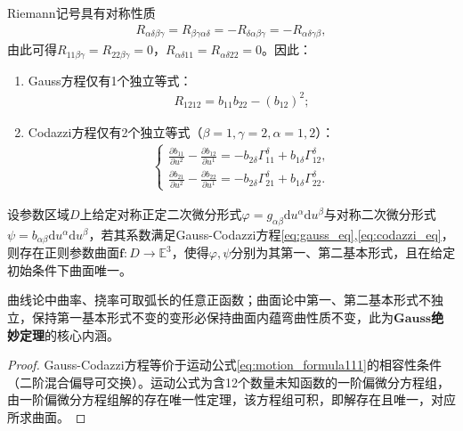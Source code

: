 \documentclass[../../main.tex]{subfiles}%
\begin{document}
\begin{remark}
Riemann记号具有对称性质
\begin{align*}
R_{\alpha\delta\beta\gamma} = R_{\beta\gamma\alpha\delta} = -R_{\delta\alpha\beta\gamma} = -R_{\alpha\delta\gamma\beta},
\end{align*}
由此可得$R_{11\beta\gamma}=R_{22\beta\gamma}=0$，$R_{\alpha\delta11}=R_{\alpha\delta22}=0$。因此：
\begin{enumerate}[(1)]
\item Gauss方程仅有1个独立等式：
\begin{align}
R_{1212} = b_{11}b_{22}-(b_{12})^2; \label{eq:gauss_indep}
\end{align}
\item Codazzi方程仅有2个独立等式（$\beta=1,\gamma=2,\alpha=1,2$）：
\begin{align}
\begin{cases}
\frac{\partial b_{11}}{\partial u^2}-\frac{\partial b_{12}}{\partial u^1} = -b_{2\delta}\Gamma^\delta_{11}+b_{1\delta}\Gamma^\delta_{12},\\
\frac{\partial b_{21}}{\partial u^2}-\frac{\partial b_{22}}{\partial u^1} = -b_{2\delta}\Gamma^\delta_{21}+b_{1\delta}\Gamma^\delta_{22}.
\end{cases} \label{eq:codazzi_indep}
\end{align}
\end{enumerate}
\end{remark}

\begin{theorem}[曲面基本形式存在唯一性定理]
设参数区域$D$上给定对称正定二次微分形式$\varphi=g_{\alpha\beta}\mathrm{d}u^\alpha\mathrm{d}u^\beta$与对称二次微分形式$\psi=b_{\alpha\beta}\mathrm{d}u^\alpha\mathrm{d}u^\beta$，若其系数满足Gauss-Codazzi方程\eqref{eq:gauss_eq},\eqref{eq:codazzi_eq}，则存在正则参数曲面$\boldsymbol{f}:D\to\mathbb{E}^3$，使得$\varphi,\psi$分别为其第一、第二基本形式，且在给定初始条件下曲面唯一。
\end{theorem}
\begin{remark}
曲线论中曲率、挠率可取弧长的任意正函数；曲面论中第一、第二基本形式不独立，保持第一基本形式不变的变形必保持曲面内蕴弯曲性质不变，此为$\mathbf{Gauss}$\textbf{绝妙定理}的核心内涵。
\end{remark}
\begin{proof}

Gauss-Codazzi方程等价于运动公式\eqref{eq:motion_formula111}的相容性条件（二阶混合偏导可交换）。运动公式为含12个数量未知函数的一阶偏微分方程组，由一阶偏微分方程组解的存在唯一性定理，该方程组可积，即解存在且唯一，对应所求曲面。

\end{proof}
\end{document}
